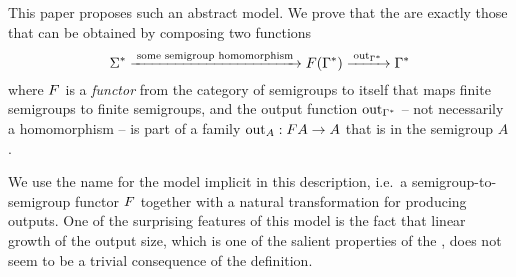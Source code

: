 This paper proposes such an abstract model.  We prove that the  are exactly those that can be obtained by composing two functions
\[ \Sigma^* 
  \xrightarrow{\;\text{some semigroup homomorphism}\;}
    \functor(\Gamma^*)
    \xrightarrow{\;\outfun_{\Gamma^*}\;}
    \Gamma^*
\]
where $\functor$ is a \emph{functor} from the category of semigroups to itself that
maps finite semigroups to finite semigroups, and the output function
$\mathrm{out}_{\Gamma^*}$ -- not necessarily a homomorphism -- is part of a family
$\outfun_A : \functor A \to A$ that is  in the semigroup $A$.

We use the name  for the model implicit in this
description, i.e.~a semigroup-to-semigroup functor $\functor$ together with a
natural transformation for producing outputs. One of the surprising features of
this model is the fact that linear growth of the output size, which is one of
the salient properties of the , does not
seem to be a trivial consequence of the definition.



